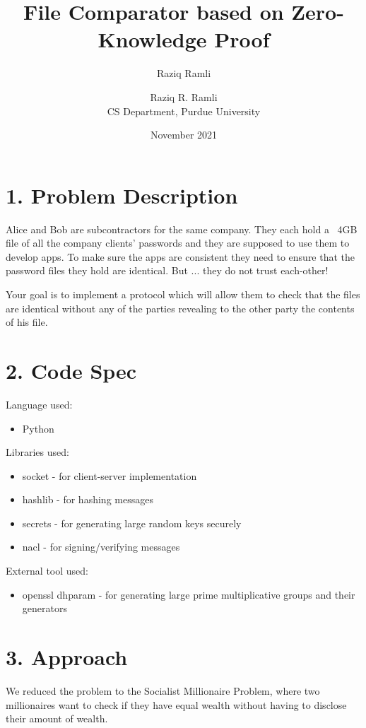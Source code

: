 \documentclass{article}
\title{File Comparator based on Zero-Knowledge Proof}
\author{Raziq Ramli}
\date{November 2021}
\author{Raziq R. Ramli\\ CS Department, Purdue University}
\begin{document}
\maketitle

\section*{1. Problem Description}

Alice and Bob are subcontractors for the same company. 
They each hold a ~4GB file of all the company clients’ 
passwords and they are supposed to use them to develop 
apps. To make sure the apps are consistent they need 
to ensure that the password files they hold are 
identical. But ... they do not trust each-other!

Your goal is to implement a protocol which will allow 
them to check that the files are identical without any 
of the parties revealing to the other party the contents 
of his file.

\section*{2. Code Spec}

Language used: 
\begin{itemize}
  \item Python
\end{itemize}

Libraries used: 
\begin{itemize}
  \item socket - for client-server implementation
  \item hashlib - for hashing messages
  \item secrets - for generating large random keys securely
  \item nacl - for signing/verifying messages
\end{itemize}

External tool used:
\begin{itemize}
  \item openssl dhparam - for generating large prime multiplicative groups 
  and their generators
\end{itemize}

\section*{3. Approach}

We reduced the problem to the Socialist Millionaire Problem, where
two millionaires want to check if they have equal wealth without having to disclose
their amount of wealth. 
\end{document}
